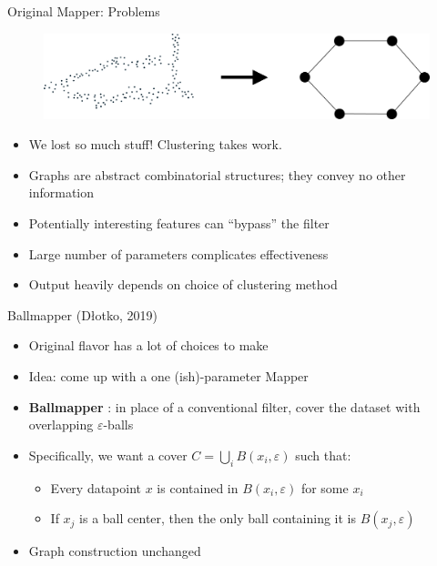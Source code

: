 \documentclass{beamer}
\begin{document}
\begin{frame}{Original Mapper: Problems}
  \begin{figure}
    \includegraphics[width=1\textwidth]{datatograph.png}
  \end{figure}
  \begin{itemize}
    \item We lost so much stuff! Clustering takes work.
    \item Graphs are abstract combinatorial structures; they convey no other information
    \item Potentially interesting features can ``bypass'' the filter
    \item Large number of parameters complicates effectiveness
    \item Output heavily depends on choice of clustering method
  \end{itemize}
\end{frame}

\begin{frame}{Ballmapper (Dłotko, 2019)}
  \begin{itemize}
    \item Original flavor has a lot of choices to make
    \item Idea: come up with a one (ish)-parameter Mapper
    \item \textbf{Ballmapper} \cite{ballmapper}: in place of a conventional filter, cover the dataset with overlapping $\varepsilon$-balls
    \item Specifically, we want a cover $C = \bigcup_i B(x_i, \varepsilon)$ such that:
    \begin{itemize}
      \item Every datapoint $x$ is contained in $B(x_i, \varepsilon)$ for some $x_i$
      \item If $x_j$ is a ball center, then the only ball containing it is $B(x_j, \varepsilon)$
    \end{itemize}
    \item Graph construction unchanged
  \end{itemize}
  
\end{frame}
\end{document}
